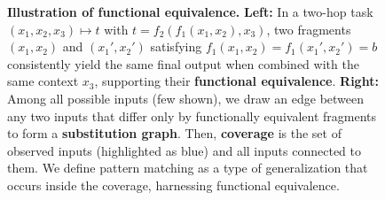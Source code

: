 \documentclass[10pt]{article}
\begin{document}
\begin{figure}[htb]
    \caption{\small
    \textbf{Illustration of functional equivalence.}
    \textbf{Left:} In a two-hop task $(x_1, x_2, x_3) \mapsto t$ with $t=f_2(f_1(x_1,x_2),x_3)$, two fragments $(x_1,x_2)$ and $(x_1',x_2')$ satisfying $f_1(x_1,x_2)=f_1(x_1',x_2')=b$ consistently yield the same final output when combined with the same context $x_3$, supporting their \textbf{functional equivalence}.
    \textbf{Right:} Among all possible inputs (few shown), we draw an edge between any two inputs that differ only by functionally equivalent fragments to form a \textbf{substitution graph}.
    Then, \textbf{coverage} is the set of observed inputs (highlighted as blue) and all inputs connected to them. We define pattern matching as a type of generalization that occurs inside the coverage, harnessing functional equivalence.}
    \label{fig:coverage_illustration}
\end{figure}
\end{document}

